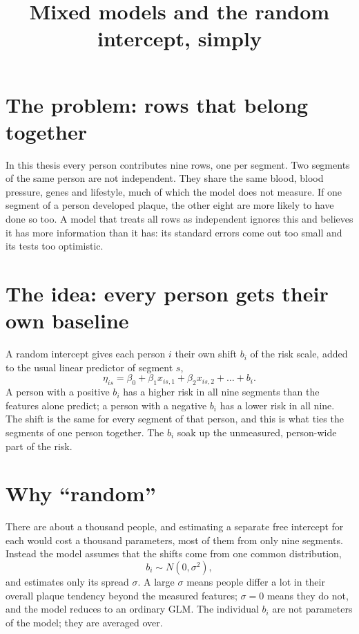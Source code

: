 \documentclass[11pt]{article}
\title{Mixed models and the random intercept, simply}
\date{}
\begin{document}
\maketitle

\section*{The problem: rows that belong together}

In this thesis every person contributes nine rows, one per segment. Two
segments of the same person are not independent. They share the same blood,
blood pressure, genes and lifestyle, much of which the model does not
measure. If one segment of a person developed plaque, the other eight are
more likely to have done so too. A model that treats all rows as independent
ignores this and believes it has more information than it has: its standard
errors come out too small and its tests too optimistic.

\section*{The idea: every person gets their own baseline}

A random intercept gives each person $i$ their own shift $b_i$ of the risk
scale, added to the usual linear predictor of segment $s$,
\[
  \eta_{is} = \beta_0 + \beta_1 x_{is,1} + \beta_2 x_{is,2} + \dots + b_i .
\]
A person with a positive $b_i$ has a higher risk in all nine segments than
the features alone predict; a person with a negative $b_i$ has a lower risk
in all nine. The shift is the same for every segment of that person, and this
is what ties the segments of one person together. The $b_i$ soak up the
unmeasured, person-wide part of the risk.

\section*{Why ``random''}

There are about a thousand people, and estimating a separate free intercept
for each would cost a thousand parameters, most of them from only nine
segments. Instead the model assumes that the shifts come from one common
distribution,
\[
  b_i \sim N(0, \sigma^2),
\]
and estimates only its spread $\sigma$. A large $\sigma$ means people differ a
lot in their overall plaque tendency beyond the measured features; $\sigma = 0$
means they do not, and the model reduces to an ordinary GLM. The individual
$b_i$ are not parameters of the model; they are averaged over.
\end{document}
